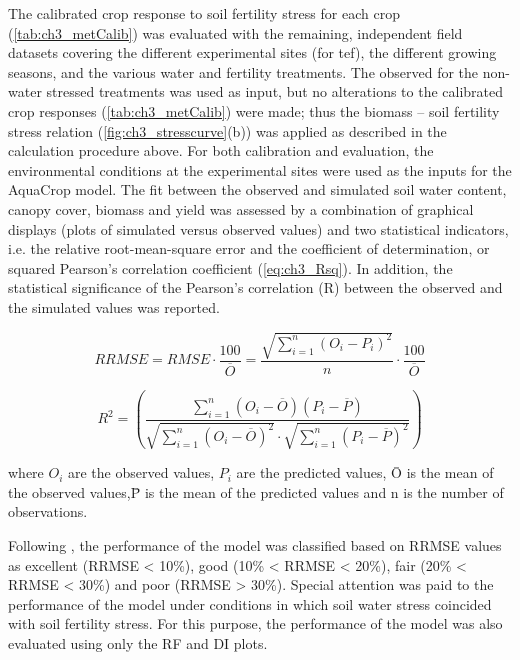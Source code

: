 The calibrated crop response to soil fertility stress for each crop (\autoref{tab:ch3_metCalib}) was evaluated with the remaining, independent field datasets covering the different experimental sites (for tef), the different growing seasons, and the various water and fertility treatments. The observed \Brel for the non-water stressed treatments was used as input, but no alterations to the calibrated crop responses (\autoref{tab:ch3_metCalib}) were made; thus the biomass – soil fertility stress relation (\autoref{fig:ch3_stresscurve}(b)) was applied as described in the calculation procedure above. For both calibration and evaluation, the environmental conditions at the experimental sites were used as the inputs for the AquaCrop model. 
The fit between the observed and simulated soil water content, canopy cover, biomass and yield was assessed by a combination of graphical displays (plots of simulated versus observed values) and two statistical indicators, i.e. the relative root-mean-square error \parencite[RRMSE; \autoref{eq:ch3_RRMSE};][]{loague1991} and the coefficient of determination, or squared Pearson’s correlation coefficient \Rsq (\autoref{eq:ch3_Rsq}). In addition, the statistical significance of the Pearson’s correlation (R) between the observed and the simulated values was reported.

\begin{equation}
 RRMSE=RMSE \cdot \frac{100}{\overline{O}}=\dfrac{\sqrt{\sum_{i=1}^n(O_{i}-P_{i})^2}}{n} \cdot \frac{100}{\overline{O}}
  \label{eq:ch3_RRMSE}
\end{equation}

\begin{equation}
 R^{2}=\left(\dfrac{\sum_{i=1}^n(O_{i}-\overline{O})(P_{i}-\overline{P})}
                   {\sqrt{\sum_{i=1}^n(O_{i}-\overline{O})^2}  \cdot \sqrt{\sum_{i=1}^n(P_{i}-\overline{P})^2 }}
 \right)
  \label{eq:ch3_Rsq}
\end{equation}

where $O_{i}$ are the observed values, $P_{i}$ are the predicted values, \=O is the mean of the observed values,\=P is the mean of the predicted values and n is the number of observations.

Following \textcite{jamieson1991}, the performance of the model was classified based on RRMSE values as excellent (RRMSE < 10\%), good (10\% < RRMSE < 20\%), fair (20\% < RRMSE < 30\%) and poor (RRMSE > 30\%). Special attention was paid to the performance of the model under conditions in which soil water stress coincided with soil fertility stress. For this purpose, the performance of the model was also evaluated using only the RF and DI plots.  

